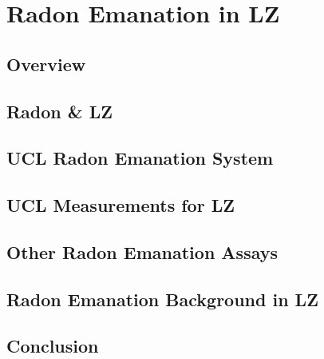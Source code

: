 \chapter{Radon Emanation in LZ}
\label{chap:chap4}

\section{Overview}

\section{Radon \& LZ}
\label{sec:radon}

\section{UCL Radon Emanation System}
\label{sec:uclradonsystem}

\section{UCL Measurements for LZ}
\label{sec:uclradon}

\section{Other Radon Emanation Assays}
\label{sec:otherradon}

\section{Radon Emanation Background in LZ}
\label{sec:lzradon}

\section{Conclusion}